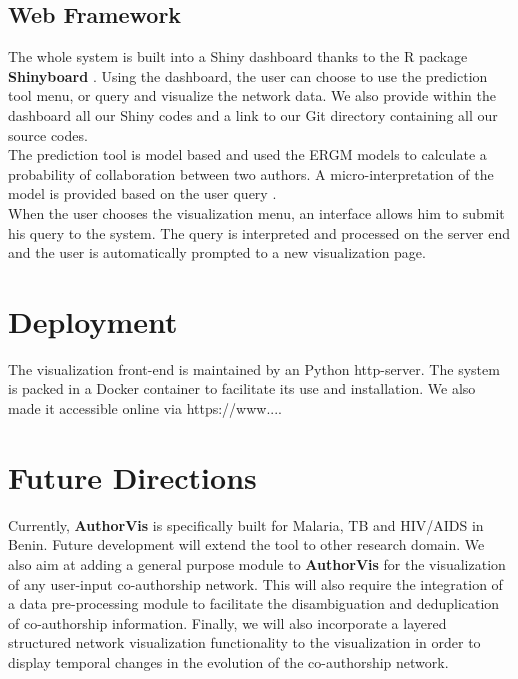 \subsection{Web Framework}
The whole system is built into a Shiny dashboard thanks to the R package \textbf{Shinyboard} \cite{chang_shiny:_2017,chang_shinydashboard:_2015}. Using the dashboard, the user can choose to use the prediction tool menu, or query and visualize the network data. We also provide within the dashboard all our Shiny codes and a link to our Git directory containing all our source codes. \\
The prediction tool is model based and used the ERGM models to calculate a probability of collaboration between two authors. A micro-interpretation of the model is provided based on the user query  \cite{desmarais_micro-level_2012}. \\
When the user chooses the visualization menu, an interface allows him to submit his query to the system. The query is interpreted and processed on the server end and the user is automatically prompted to a new visualization page.

\section{Deployment}
The visualization front-end is maintained by an Python http-server. The system is packed in a Docker container to facilitate its use and installation. We also made it accessible online via https://www....

\section{Future Directions}
Currently, \textbf{AuthorVis} is specifically built for Malaria, TB and HIV/AIDS in Benin. Future development will extend the tool to other research domain. We also aim at adding a general purpose module to \textbf{AuthorVis} for the visualization of any user-input co-authorship network. This will also require the integration of a data pre-processing module to facilitate the disambiguation and deduplication of co-authorship information. Finally, we will also incorporate a layered structured network visualization \cite{nakazono_nel_2006} functionality to the visualization in order to display temporal changes in the evolution of the co-authorship network.


